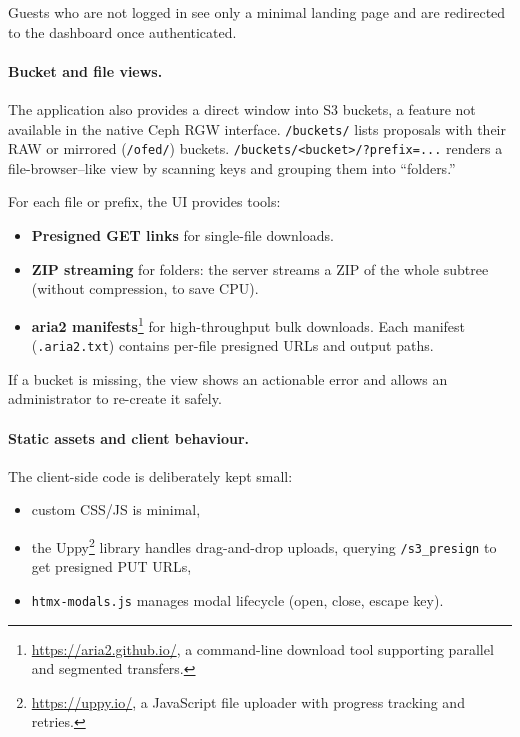 Guests who are not logged in see only a minimal landing page and are redirected to the dashboard once authenticated.

\paragraph{Bucket and file views.}
The application also provides a direct window into S3 buckets, a feature not 
available in the native Ceph RGW interface.  
\texttt{/buckets/} lists proposals with their RAW or mirrored (\texttt{/ofed/}) buckets.  
\texttt{/buckets/<bucket>/?prefix=...} renders a file-browser–like view by scanning keys and grouping them into “folders.”  

For each file or prefix, the UI provides tools:  
\begin{itemize}
	\item \textbf{Presigned GET links} for single-file downloads.  
	\item \textbf{ZIP streaming} for folders: the server streams a ZIP of the whole subtree 
	(without compression, to save CPU).  
	\item \textbf{aria2 manifests}\footnote{\url{https://aria2.github.io/}, a command-line download tool supporting parallel and segmented transfers.} 
	for high-throughput bulk downloads. Each manifest (\texttt{.aria2.txt}) contains per-file presigned URLs and output paths.  
\end{itemize}

If a bucket is missing, the view shows an actionable error and allows an administrator to re-create it safely.

\paragraph{Static assets and client behaviour.}
The client-side code is deliberately kept small:  
\begin{itemize}
	\item custom CSS/JS is minimal,  
	\item the Uppy\footnote{\url{https://uppy.io/}, a JavaScript file uploader with progress tracking and retries.} library handles drag-and-drop uploads, 
	querying \texttt{/s3\_presign} to get presigned PUT URLs,  
	\item \texttt{htmx-modals.js} manages modal lifecycle (open, close, escape key).  
\end{itemize}

